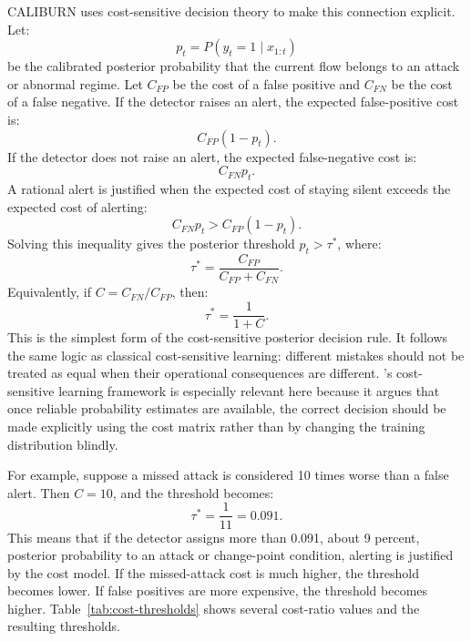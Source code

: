 \documentclass[preprint,12pt,authoryear]{elsarticle}
\newcommand{\caliburn}{CALIBURN}
\begin{document}
\caliburn{} uses cost-sensitive decision theory to make this connection explicit. Let:
\begin{equation}
    p_t = P(y_t = 1 \mid x_{1:t})
\end{equation}
be the calibrated posterior probability that the current flow belongs to an attack or abnormal regime. Let $C_{FP}$ be the cost of a false positive and $C_{FN}$ be the cost of a false negative. If the detector raises an alert, the expected false-positive cost is:
\begin{equation}
    C_{FP}(1 - p_t).
\end{equation}
If the detector does not raise an alert, the expected false-negative cost is:
\begin{equation}
    C_{FN} p_t.
\end{equation}
A rational alert is justified when the expected cost of staying silent exceeds the expected cost of alerting:
\begin{equation}
    C_{FN} p_t > C_{FP}(1 - p_t).
\end{equation}
Solving this inequality gives the posterior threshold $p_t > \tau^{*}$, where:
\begin{equation}
    \tau^{*} = \frac{C_{FP}}{C_{FP} + C_{FN}}.
    \label{eq:threshold-derivation}
\end{equation}
Equivalently, if $C = C_{FN}/C_{FP}$, then:
\begin{equation}
    \tau^{*} = \frac{1}{1 + C}.
    \label{eq:threshold-cost-ratio}
\end{equation}
This is the simplest form of the cost-sensitive posterior decision rule. It follows the same logic as classical cost-sensitive learning: different mistakes should not be treated as equal when their operational consequences are different. \citet{elkan2001foundations}'s cost-sensitive learning framework is especially relevant here because it argues that once reliable probability estimates are available, the correct decision should be made explicitly using the cost matrix rather than by changing the training distribution blindly.

For example, suppose a missed attack is considered 10 times worse than a false alert. Then $C = 10$, and the threshold becomes:
\begin{equation}
    \tau^{*} = \frac{1}{11} = 0.091.
\end{equation}
This means that if the detector assigns more than 0.091, about 9 percent, posterior probability to an attack or change-point condition, alerting is justified by the cost model. If the missed-attack cost is much higher, the threshold becomes lower. If false positives are more expensive, the threshold becomes higher. Table~\ref{tab:cost-thresholds} shows several cost-ratio values and the resulting thresholds.
\end{document}
